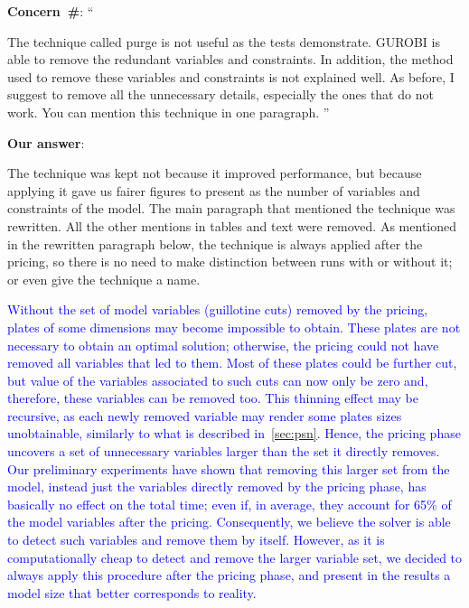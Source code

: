 \documentclass[smallextended]{svjour3}       %
\makeatletter
\newif\iffinalversion
\newcommand{\newtext}[1]{\iffinalversion%
#1%
\else%
\textcolor{blue}{#1}%
\fi%
}
\newcommand\gobblepars{%
    \@ifnextchar\par%
        {\expandafter\gobblepars\@gobble}%
        {}}
\newcounter{concern}
\newenvironment{concern}{%
    \refstepcounter{concern}\par\smallskip\noindent%
    \textbf{Concern~\#\theconcern}: ``\itshape\gobblepars}%
    {\unskip''\smallskip}
\newcounter{answer}
\newenvironment{answer}{%
    \refstepcounter{answer}\par\smallskip\noindent%
    \textbf{Our answer}: \gobblepars}%
    {\unskip\bigskip}
\makeatother
\begin{document}
\begin{concern}
The technique called purge is not useful as the tests demonstrate. GUROBI is able to remove the redundant variables and constraints. In addition, the method used to remove these variables and constraints is not explained well. As before, I suggest to remove all the unnecessary details, especially the ones that do not work. You can mention this technique in one paragraph.
\end{concern}
\begin{answer}
The technique was kept not because it improved performance, but because applying it gave us fairer figures to present as the number of variables and constraints of the model. The main paragraph that mentioned the technique was rewritten. All the other mentions in tables and text were removed. As mentioned in the rewritten paragraph below, the technique is always applied after the pricing, so there is no need to make distinction between runs with or without it; or even give the technique a name.

\newtext{Without the set of model variables (guillotine cuts) removed by the pricing, plates of some dimensions may become impossible to obtain. These plates are not necessary to obtain an optimal solution; otherwise, the pricing could not have removed all variables that led to them. Most of these plates could be further cut, but value of the variables associated to such cuts can now only be zero and, therefore, these variables can be removed too. This thinning effect may be recursive, as each newly removed variable may render some plates sizes unobtainable, similarly to what is described in~\autoref{sec:psn}. Hence, the pricing phase uncovers a set of unnecessary variables larger than the set it directly removes. Our preliminary experiments have shown that removing this larger set from the model, instead just the variables directly removed by the pricing phase, has basically no effect on the total time; even if, in average, they account for 65\% of the model variables after the pricing. Consequently, we believe the solver is able to detect such variables and remove them by itself. However, as it is computationally cheap to detect and remove the larger variable set, we decided to always apply this procedure after the pricing phase, and present in the results a model size that better corresponds to reality.}
\end{answer}
\end{document}
